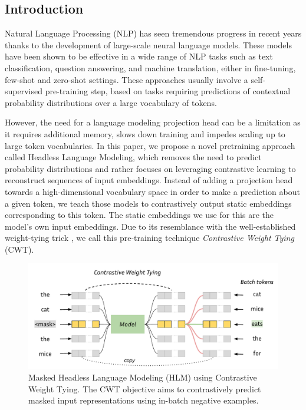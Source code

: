 \subsection{Introduction}

Natural Language Processing (NLP) has seen tremendous progress in recent years thanks to the development of large-scale neural language models. These models have been shown to be effective in a wide range of NLP tasks such as text classification, question answering, and machine translation, either in fine-tuning, few-shot and zero-shot settings. These approaches usually involve a self-supervised pre-training step, based on tasks requiring predictions of contextual probability distributions over a large vocabulary of tokens.

However, the need for a language modeling projection head can be a limitation as it requires additional memory, slows down training and impedes scaling up to large token vocabularies. In this paper, we propose a novel pretraining approach called Headless Language Modeling, which removes the need to predict probability distributions and rather focuses on leveraging contrastive learning to reconstruct sequences of input embeddings. Instead of adding a projection head towards a high-dimensional vocabulary space in order to make a prediction about a given token, we teach those models to contrastively output static embeddings corresponding to this token. The static embeddings we use for this are the model's own input embeddings. Due to its resemblance with the well-established weight-tying trick \citep{press-wolf-2017-using,he2023debertav3}, we call this pre-training technique \textit{Contrastive Weight Tying} (CWT).

\begin{figure}[h]
    \centering
    \includegraphics[width=0.6\linewidth]{sources/part_2/headless/imgs/hlm_basic.pdf}
    \caption{Masked Headless Language Modeling (HLM) using Contrastive Weight Tying. The CWT objective aims to contrastively predict masked input representations using in-batch negative examples.}
    \label{fig:cwt_schema}
\end{figure}

